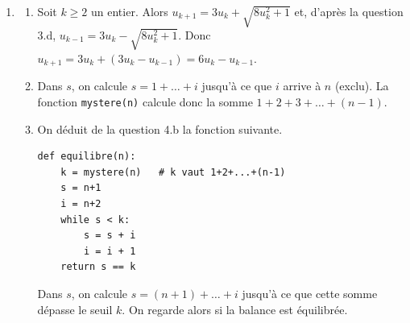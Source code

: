 \begin{enumerate}
\begin{enumerate}
    \item $u_2 = f(u_1) = f(6) = 35$. Puisque $n$ est équilibré, on déduit du résultat admis par l'énoncé que si $n \leq 35$, alors $n = 6$ ou $n = 35$. Or, $u_1 = 6$ et $u_2 = 35$ et $n$ n'est pas de la forme $u_k$. On en déduit que $n > 35$, c'est-à-dire que $n > u_2$. Puisque la suite d'entiers naturels $(u_k)_{k \geq 1}$ est strictement croissante, il existe un entier $m \geq 2$ tel que $u_m < n < u_{m+1}$.
    
    On déduit de la croissance de $g$ établie à la question 3.e que $g(u_m) < g(n) < g(u_{m+1})$. Or, d'après la question 3.d, $g(u_m) = u_{m-1}$ et $g(u_{m+1}) = u_m$. D'où $u_{m-1} < g(n) < u_m$. Comme $u_m < n$, on a donc $g(n) < u_m < n$ donc $g(n) < n$.
    
    D'après la question 3.b, $n > 35$ donc $n > 6$. Or, $n$ est un nombre équilibré. On vérifie (comme on l'a fait avec $f(n)$) que $g(n)$ l'est aussi. On en déduit que $g(n)$ est un nombre équilibré qui ne s'écrit pas sous la forme $u_k$ pour un certain entier $k \geq 1$. Finalement $n$ n'est pas le plus petit nombre équilibré ne s'écrivant pas sous forme $u_k$ pour un certain entier $k \geq 1$, ce qui est absurde par définition de $n$. Ainsi, tout nombre équilibré est de la forme $u_k$ pour un certain entier $k \geq 1$.
\end{enumerate}

\item \textbf{}
\begin{enumerate}
    \item Soit $k \geq 2$ un entier. Alors $u_{k+1} = 3u_k + \sqrt{8u_k^2 + 1}$ et, d'après la question 3.d, $u_{k-1} = 3u_k - \sqrt{8u_k^2 + 1}$. Donc $u_{k+1} = 3u_k + (3u_k - u_{k-1}) = 6u_k - u_{k-1}$.
    
    \item Dans $s$, on calcule $s = 1 + \ldots + i$ jusqu'à ce que $i$ arrive à $n$ (exclu). La fonction \texttt{mystere(n)} calcule donc la somme $1 + 2 + 3 + \ldots + (n - 1)$.
    
    \item On déduit de la question 4.b la fonction suivante.
    
    \begin{verbatim}
def equilibre(n):
    k = mystere(n)   # k vaut 1+2+...+(n-1)
    s = n+1
    i = n+2
    while s < k:
        s = s + i
        i = i + 1
    return s == k
    \end{verbatim}
    
    Dans $s$, on calcule $s = (n+1) + \ldots + i$ jusqu'à ce que cette somme dépasse le seuil $k$. On regarde alors si la balance est équilibrée.
    

\end{enumerate}
\end{enumerate}
